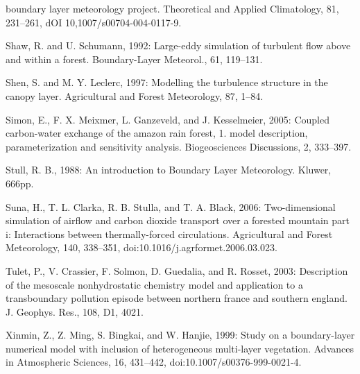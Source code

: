 \begin{description}
boundary layer meteorology project. Theoretical and Applied Climatology, 81, 231–261, dOI
10,1007/s00704-004-0117-9.
\item
Shaw, R. and U. Schumann, 1992: Large-eddy simulation of turbulent flow above and within a
forest. Boundary-Layer Meteorol., 61, 119–131.
\item
Shen, S. and M. Y. Leclerc, 1997: Modelling the turbulence structure in the canopy layer.
Agricultural and Forest Meteorology, 87, 1–84.
\item
Simon, E., F. X. Meixmer, L. Ganzeveld, and J. Kesselmeier, 2005: Coupled carbon-water
exchange of the amazon rain forest, 1. model description, parameterization and sensitivity
analysis. Biogeosciences Discussions, 2, 333–397.
\item
Stull, R. B., 1988: An introduction to Boundary Layer Meteorology. Kluwer, 666pp.
\item
Suna, H., T. L. Clarka, R. B. Stulla, and T. A. Black, 2006: Two-dimensional simulation of airflow and carbon dioxide transport over a forested mountain part i: Interactions between
thermally-forced circulations. Agricultural and Forest Meteorology, 140, 338–351,
doi:10.1016/j.agrformet.2006.03.023.
\item
Tulet, P., V. Crassier, F. Solmon, D. Guedalia, and R. Rosset, 2003: Description of the mesoscale
nonhydrostatic chemistry model and application to a transboundary pollution episode between
northern france and southern england. J. Geophys. Res., 108, D1, 4021.
\item
Xinmin, Z., Z. Ming, S. Bingkai, and W. Hanjie, 1999: Study on a boundary-layer numerical
model with inclusion of heterogeneous multi-layer vegetation. Advances in Atmospheric
Sciences, 16, 431–442, doi:10.1007/s00376-999-0021-4.

\end{description}


